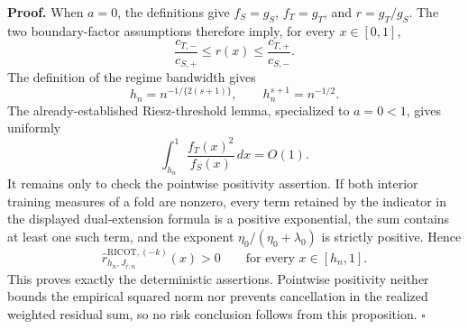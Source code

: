 \textbf{Proof.}
When \(a=0\), the definitions give \(f_S=g_S\), \(f_T=g_T\), and \(r=g_T/g_S\). The two boundary-factor assumptions therefore imply, for every \(x\in[0,1]\),
\[
\frac{c_{T,-}}{c_{S,+}}\le r(x)\le\frac{c_{T,+}}{c_{S,-}}.
\]
The definition of the regime bandwidth gives
\[
h_n=n^{-1/\{2(s+1)\}},
\qquad
h_n^{s+1}=n^{-1/2}.
\]
The already-established Riesz-threshold lemma, specialized to \(a=0<1\), gives uniformly
\[
\int_{h_n}^1\frac{f_T(x)^2}{f_S(x)}\,dx=O(1).
\]
It remains only to check the pointwise positivity assertion. If both interior training measures of a fold are nonzero, every term retained by the indicator in the displayed dual-extension formula is a positive exponential, the sum contains at least one such term, and the exponent \(\eta_0/(\eta_0+\lambda_0)\) is strictly positive. Hence
\[
\widehat r^{\mathrm{RICOT},(-k)}_{h_n,J_{r,n}}(x)>0
\qquad\text{for every }x\in[h_n,1].
\]
This proves exactly the deterministic assertions. Pointwise positivity neither bounds the empirical squared norm nor prevents cancellation in the realized weighted residual sum, so no risk conclusion follows from this proposition. \(\square\)